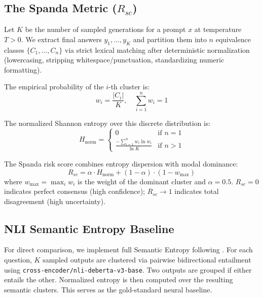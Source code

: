 \documentclass[11pt]{article}
\begin{document}
\subsection{The Spanda Metric ($R_{sc}$)}

Let $K$ be the number of sampled generations for a prompt $x$ at temperature $T > 0$. We extract final answers $y_1, \dots, y_K$ and partition them into $n$ equivalence classes $\{C_1, \dots, C_n\}$ via strict lexical matching after deterministic normalization (lowercasing, stripping whitespace/punctuation, standardizing numeric formatting).

The empirical probability of the $i$-th cluster is:
\begin{equation}
    w_i = \frac{|C_i|}{K}, \quad \sum_{i=1}^{n} w_i = 1
\end{equation}

The normalized Shannon entropy over this discrete distribution is:
\begin{equation}
    H_{\text{norm}} = \begin{cases}
        0 & \text{if } n = 1 \\
        \displaystyle\frac{-\sum_{i=1}^{n} w_i \ln w_i}{\ln K} & \text{if } n > 1
    \end{cases}
\end{equation}

The Spanda risk score combines entropy dispersion with modal dominance:
\begin{equation}
    R_{sc} = \alpha \cdot H_{\text{norm}} + (1 - \alpha) \cdot (1 - w_{\max})
\end{equation}
where $w_{\max} = \max_i w_i$ is the weight of the dominant cluster and $\alpha = 0.5$. $R_{sc} = 0$ indicates perfect consensus (high confidence); $R_{sc} \to 1$ indicates total disagreement (high uncertainty).

\subsection{NLI Semantic Entropy Baseline}

For direct comparison, we implement full Semantic Entropy following \cite{kuhn2023semantic}. For each question, $K$ sampled outputs are clustered via pairwise bidirectional entailment using \texttt{cross-encoder/nli-deberta-v3-base}. Two outputs are grouped if either entails the other. Normalized entropy is then computed over the resulting semantic clusters. This serves as the gold-standard neural baseline.
\end{document}
